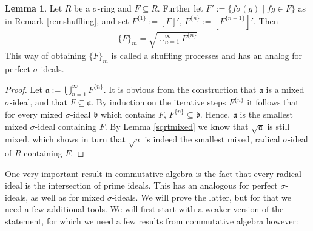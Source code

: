 \documentclass{article}
\def\N{\mathbb{N}}
\def\a{\mathfrak{a}}
\def\b{\mathfrak{b}}
\def\s{\sigma}
\def\si{\unlhd_{\sigma}}
\theoremstyle{definition}
\newtheorem{ex}[Satz]{Example}
\newtheorem{lem}[Satz]{Lemma}
\begin{document}
\begin{lem}\label{lemsuffling}
Let $R$ be a $\s$-ring and $F \subseteq R$. Further let $F' := \{f\s(g) \mid fg \in F \}$ as in Remark \ref{remshuffling}, and set $F^{\{1\}}:= [F]'$, $F^{\{n\}}:= [F^{\{n-1\}}]'$. Then
\begin{align} \{F\}_m = \sqrt{\cup_{n=1}^{\infty} F^{\{n\}}} \end{align}
This way of obtaining $\{F\}_m$ is called a shuffling processes and has an analog for perfect $\s$-ideals. 
\begin{proof}
Let $\a:= \bigcup_{n=1}^{\infty} F^{\{n\}}$. It is obvious from the construction that $\a$ is a mixed $\s$-ideal, and that $F \subseteq \a$. 
By induction on the iterative steps $F^{\{n\}}$ it follows that for every mixed $\s$-ideal $\b$ which contains $F$, $F^{\{n\}} \subseteq \b$. Hence, $\a$ is the smallest mixed $\s$-ideal containing $F$.
By Lemma \ref{sqrtmixed} we know that $\sqrt{\a}$ is still mixed, which shows in turn that $\sqrt a$ is indeed the smallest mixed, radical $\s$-ideal of $R$ containing $F$. 
\end{proof}
\end{lem}


 

One very important result in commutative algebra is the fact that every radical ideal is the intersection of prime ideals. This has an analogous for perfect $\s$-ideals, as well as for mixed $\s$-ideals. 
We will prove the latter, but for that we need a few additional tools. We will first start with a weaker version of the statement, for which we need a few results from commutative algebra however:
\end{document}
